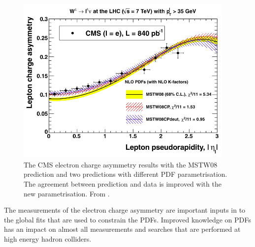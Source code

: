 \begin{figure}[htbp]
  \begin{center}
  \includegraphics*[width=0.95\textwidth]{viewer}
  \caption[The CMS electron charge asymmetry results with the MSTW08 prediction
and two predictions with different PDF parametrisation. The agreement between
prediction and data is improved with the new parametrisation.] {The CMS
electron charge asymmetry results with the MSTW08 prediction and two predictions
with different PDF parametrisation. The agreement between prediction and data
is improved with the new parametrisation.  From \cite{martin2013extended}.  }
\label{fig:mstwimprovement}
  \end{center}
\end{figure}

The measurements of the electron charge asymmetry are important inputs in to
the global fits that are used to constrain the PDFs. Improved knowledge on PDFs
has an impact on almost all measurements and searches that are performed at high
energy hadron colliders.

